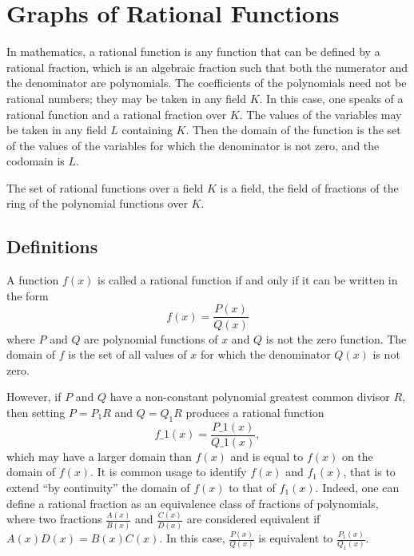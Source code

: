 \section{Graphs of Rational Functions}
\label{sec:grap-2359}

In mathematics, a rational function is any function that can be defined by a rational fraction, which is an algebraic fraction such that both the numerator and the denominator are polynomials. The coefficients of the polynomials need not be rational numbers; they may be taken in any field $K$. In this case, one speaks of a rational function and a rational fraction over $K$. The values of the variables may be taken in any field $L$ containing $K$. Then the domain of the function is the set of the values of the variables for which the denominator is not zero, and the codomain is $L$.

The set of rational functions over a field $K$ is a field, the field of fractions of the ring of the polynomial functions over $K$.

\subsection{Definitions}
\label{sss:defi-9fdc}

A function $f(x)$ is called a rational function if and only if it can be written in the form
\[
f(x) = \frac{P(x)}{Q(x)}
\]
where $P$ and $Q$ are polynomial functions of $x$ and $Q$ is not the zero function. The domain of $f$ is the set of all values of $x$ for which the denominator $Q(x)$ is not zero.

However, if $P$ and $Q$ have a non-constant polynomial greatest common divisor $R$, then setting $P = P_1 R$ and $Q = Q_1 R$ produces a rational function
\[
f\_1(x) = \frac{P\_1(x)}{Q\_1(x)},
\]
which may have a larger domain than $f(x)$ and is equal to $f(x)$ on the domain of $f(x)$. It is common usage to identify $f(x)$ and $f_1(x)$, that is to extend ``by continuity'' the domain of $f(x)$ to that of $f_1(x)$. Indeed, one can define a rational fraction as an equivalence class of fractions of polynomials, where two fractions $\frac{A(x)}{B(x)}$ and $\frac{C(x)}{D(x)}$ are considered equivalent if $A(x)D(x) = B(x)C(x)$. In this case, $\frac{P(x)}{Q(x)}$ is equivalent to $\frac{P_1(x)}{Q_1(x)}$.

